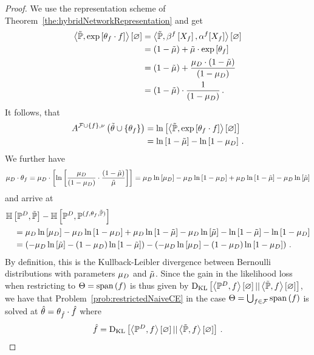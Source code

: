 \begin{proof}
    We use the representation scheme of Theorem~\ref{the:hybridNetworkRepresentation} and get %
    \begin{align*}
        \left\langle \tilde{\mathbb{P}}, \mathrm{exp}\left[\theta_{f} \cdot f\right]\right\rangle \left[ \varnothing \right]
        & = \left\langle \tilde{\mathbb{P}}, \beta^{f}\left[X_{f}\right], \alpha^{f}[X_{f}]\right\rangle \left[ \varnothing \right] \\
        & = (1-\tilde{\mu}) + \tilde{\mu}\cdot \mathrm{exp}\left[\theta_{f}\right] \\
        & = (1 - \tilde{\mu}) + \frac{\mu_{D} \cdot (1-\tilde{\mu})}{(1-\mu_{D})} \\
        & = (1-\tilde{\mu}) \cdot \frac{1}{(1-\mu_{D})} \, .
    \end{align*}
    It follows, that
    \begin{align*}
        A^{\mathcal{F}\cup\{f\},\nu}\left(\tilde{\theta}\cup\{\theta_{f}\}\right)
        & = \ln \left[ \left\langle \tilde{\mathbb{P}}, \mathrm{exp}\left[\theta_{f} \cdot f\right]\right\rangle \left[ \varnothing \right] \right] \\
        & = \ln \left[ 1-\tilde{\mu} \right] - \ln \left[ 1-\mu_{D} \right] \, .
    \end{align*}
    We further have
    \begin{align*}
        \mu_{D} \cdot \theta_{f}
        = \mu_{D} \cdot \left[ \ln \left[ \frac{\mu_{D}}{(1-\mu_{D})}\cdot \frac{(1-\tilde{\mu})}{\tilde{\mu}} \right]  \right]
        = \mu_{D} \ln \left[ \mu_{D} \right] - \mu_{D} \ln \left[ 1-\mu_{D} \right] + \mu_{D} \ln \left[ 1-\tilde{\mu} \right] - \mu_{D} \ln \left[ \tilde{\mu} \right]
    \end{align*}
    and arrive at
    \begin{align*}
        & \mathbb{H}\left[\mathbb{P}^{D},\tilde{\mathbb{P}}\right]
        - \mathbb{H}\left[\mathbb{P}^{D},\mathbb{P}^{(f,\theta_{f},\tilde{\mathbb{P}})}\right] \\
        & \quad =  \mu_{D} \ln \left[ \mu_{D} \right] - \mu_{D} \ln \left[ 1-\mu_{D} \right] + \mu_{D} \ln \left[ 1-\tilde{\mu} \right] - \mu_{D} \ln \left[ \tilde{\mu} \right]
        -  \ln \left[ 1-\tilde{\mu} \right] - \ln \left[ 1-\mu_{D} \right] \\
        & \quad = \left( -\mu_{D} \ln \left[ \tilde{\mu} \right] - (1-\mu_{D}) \ln \left[ 1-\tilde{\mu} \right] \right)  - \left( -\mu_{D} \ln \left[ \mu_{D} \right] - (1-\mu_{D}) \ln \left[ 1-\mu_{D} \right] \right) \, .
    \end{align*}
    By definition, this is the Kullback-Leibler divergence between Bernoulli distributions with parameters $\mu_{D}$ and $\tilde{\mu}$.
    Since the gain in the likelihood loss when restricting to $\Theta = \mathrm{span}\left(f\right)$ is thus given by $\mathrm{D}_{\mathrm{KL}}\left[ \left\langle \mathbb{P}^{D},f\right\rangle \left[ \varnothing \right] || \left\langle \tilde{\mathbb{P}},f\right\rangle \left[ \varnothing \right] \right]$, we have that Problem~\ref{prob:restrictedNaiveCE}  in the case $\Theta = \bigcup_{f\in\mathcal{F}}\mathrm{span}\left(f\right)$ is solved at $\hat{\theta} = \theta_{\hat{f}}\cdot \hat{f}$ where
    \[ \hat{f} = \mathrm{D}_{\mathrm{KL}}\left[ \left\langle \mathbb{P}^{D},f\right\rangle \left[ \varnothing \right] || \left\langle \tilde{\mathbb{P}},f\right\rangle \left[ \varnothing \right] \right] \, . \]
\end{proof}

